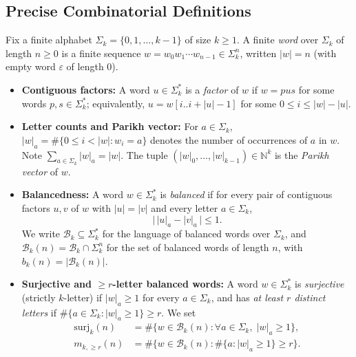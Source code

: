 \documentclass[11pt,a4paper]{article}
\theoremstyle{definition}
\newcommand{\N}{\mathbb{N}}
\newcommand{\surj}{\mathrm{surj}}
\begin{document}
\subsection{Precise Combinatorial Definitions}
Fix a finite alphabet $\Sigma_k = \{0, 1, \dots, k-1\}$ of size $k \ge 1$. A finite \emph{word} over $\Sigma_k$ of length $n \ge 0$ is a finite sequence $w = w_0 w_1 \cdots w_{n-1} \in \Sigma_k^n$, written $|w| = n$ (with empty word $\varepsilon$ of length $0$).
\begin{itemize}
  \item \textbf{Contiguous factors:} A word $u \in \Sigma_k^*$ is a \emph{factor} of $w$ if $w = p u s$ for some words $p, s \in \Sigma_k^*$; equivalently, $u = w[i .. i + |u| - 1]$ for some $0 \le i \le |w| - |u|$.
  \item \textbf{Letter counts and Parikh vector:} For $a \in \Sigma_k$, $|w|_a = \#\{0 \le i < |w| : w_i = a\}$ denotes the number of occurrences of $a$ in $w$. Note $\sum_{a \in \Sigma_k} |w|_a = |w|$. The tuple $(|w|_0, \dots, |w|_{k-1}) \in \N^k$ is the \emph{Parikh vector} of $w$.
  \item \textbf{Balancedness:} A word $w \in \Sigma_k^*$ is \emph{balanced} if for every pair of contiguous factors $u, v$ of $w$ with $|u| = |v|$ and every letter $a \in \Sigma_k$,
  \[
    \bigl|\,|u|_a - |v|_a\,\bigr| \le 1.
  \]
  We write $\mathcal{B}_k \subseteq \Sigma_k^*$ for the language of balanced words over $\Sigma_k$, and $\mathcal{B}_k(n) = \mathcal{B}_k \cap \Sigma_k^n$ for the set of balanced words of length $n$, with $b_k(n) = |\mathcal{B}_k(n)|$.
  \item \textbf{Surjective and $\ge r$-letter balanced words:} A word $w \in \Sigma_k^*$ is \emph{surjective} (strictly $k$-letter) if $|w|_a \ge 1$ for every $a \in \Sigma_k$, and has \emph{at least $r$ distinct letters} if $\#\{a \in \Sigma_k : |w|_a \ge 1\} \ge r$. We set
  \begin{align*}
    \surj_k(n) &= \#\{w \in \mathcal{B}_k(n) : \forall a \in \Sigma_k,\; |w|_a \ge 1\}, \\
    m_{k,\ge r}(n) &= \#\bigl\{w \in \mathcal{B}_k(n) : \#\{a : |w|_a \ge 1\} \ge r\bigr\}.
  \end{align*}
\end{itemize}
\end{document}
